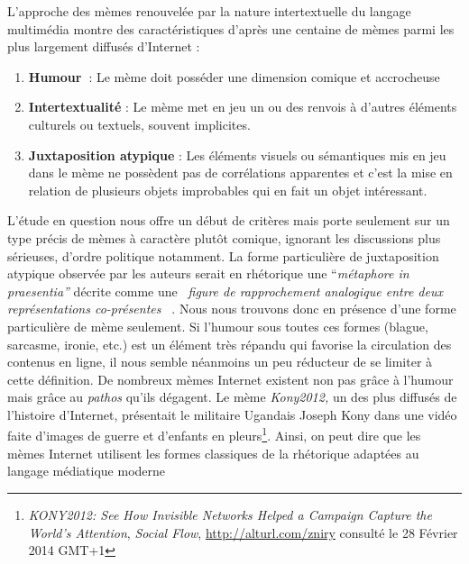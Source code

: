 L{\textquoteright}approche des mèmes renouvelée par la nature
intertextuelle du langage multimédia montre des caractéristiques
 d{\textquoteright}après une centaine de mèmes parmi les plus
largement diffusés d{\textquoteright}Internet : 

\begin{enumerate}
\item {\color{black}
\textbf{Humour~}: Le mème doit posséder une dimension comique et
accrocheuse}
\item {\color{black}
\textbf{Intertextualité} : Le mème met en jeu un ou des renvois à
d{\textquoteright}autres éléments culturels ou textuels, souvent
implicites.}
\item {\color{black}
\textbf{Juxtaposition atypique} : Les éléments visuels ou
sémantiques mis en jeu dans le mème ne possèdent pas de
corrélations apparentes et c{\textquoteright}est la mise en relation
de plusieurs objets improbables qui en fait un objet intéressant.}
\end{enumerate}
L{\textquoteright}étude en question nous offre un début de
critères mais porte seulement sur un type précis de mèmes à
caractère plutôt comique, ignorant les discussions plus
sérieuses, d{\textquoteright}ordre politique notamment. La forme
particulière de juxtaposition atypique observée par les auteurs
serait en rhétorique une {\textquotedblleft}\textit{métaphore in
praesentia{\textquotedblright} }décrite comme une
\textit{{\guillemotleft}~figure de rapprochement analogique entre deux
représentations co-présentes~{\guillemotright}} \citep{Jenny2012}. Nous
nous trouvons donc en présence d{\textquoteright}une forme
particulière de mème seulement. Si l{\textquoteright}humour sous
toutes ces formes (blague, sarcasme, ironie, etc.) est un élément
très répandu qui favorise la circulation des contenus en ligne, il
nous semble néanmoins un peu réducteur de se limiter à cette
définition. De nombreux mèmes Internet existent non pas gr\^ace à
l{\textquoteright}humour mais gr\^ace au \textit{pathos}
qu{\textquoteright}ils dégagent. Le mème \textit{Kony2012, }un des
plus diffusés de l{\textquoteright}histoire
d{\textquoteright}Internet, présentait le militaire Ugandais Joseph
Kony dans une vidéo faite d{\textquoteright}images de guerre et
d{\textquoteright}enfants en pleurs\footnote{ \textit{KONY2012: See How Invisible Networks Helped a Campaign Capture the World's Attention}, \textit{Social Flow}, \url{http://alturl.com/zniry} consulté le 28 Février 2014 GMT+1}.
Ainsi, on peut dire que les mèmes Internet utilisent les formes
classiques de la rhétorique adaptées au langage médiatique moderne

